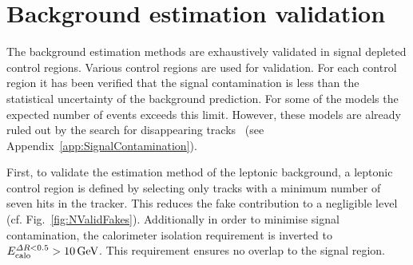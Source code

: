\section{Background estimation validation}
\label{sec:BkgValidation}

The background estimation methods are exhaustively validated in signal depleted control regions.
Various control regions are used for validation.
For each control region it has been verified that the signal contamination is less than the statistical uncertainty of the background prediction.
For some of the models the expected number of events exceeds this limit. However, these models are already ruled out by the search for disappearing tracks~\cite{bib:CMS:DT_8TeV} (see Appendix~\ref{app:SignalContamination}).

First, to validate the estimation method of the leptonic background, a leptonic control region is defined by selecting only tracks with a minimum number of seven hits in the tracker.
This reduces the fake contribution to a negligible level (cf. Fig.~\ref{fig:NValidFakes}).
Additionally in order to minimise signal contamination, the calorimeter isolation requirement is inverted to $E^{\Delta R<0.5}_{\text{calo}}>10\,\text{Ge}\kern-0.06667em\text{V}$.
This requirement ensures no overlap to the signal region.

